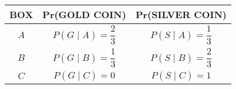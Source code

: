 \begin{tabular}{|c|c|c|}
\hline
 \textbf{BOX} & \textbf{Pr(GOLD COIN)} & \textbf{Pr(SILVER COIN)}\\
\hline
 $A$ & $\displaystyle P(G \mid A)= \dfrac{2}{3}$ & $\displaystyle P(S \mid A)= \dfrac{1}{3}$ \\
\hline
 $B$ & $\displaystyle P(G \mid B)= \dfrac{1}{3}$ & $\displaystyle P(S \mid B)= \dfrac{2}{3}$ \\
\hline
 $C$ & $\displaystyle P(G \mid C)= 0 $ & $\displaystyle P(S \mid C)= 1 $ \\
\hline
\end{tabular}\\
